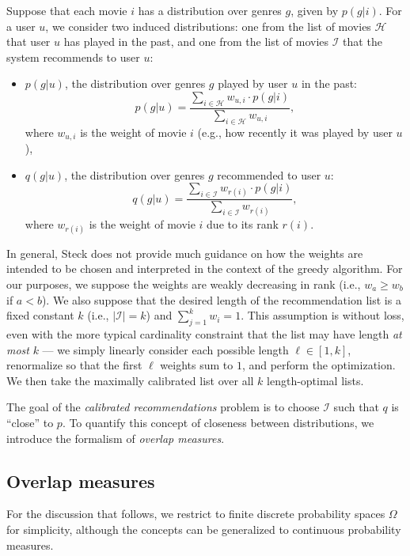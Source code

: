 Suppose that each movie $i$ has a distribution over genres $g$, given by $p(g|i)$. For a user $u$, we consider two induced distributions: one from the list of movies $\mathcal{H}$ that user $u$ has played in the past, and one from the list of movies $\mathcal{I}$ that the system recommends to user $u$:
\begin{itemize}
    \item $p(g|u)$, the distribution over genres $g$ played by user $u$ in the past: $$p(g|u) = \frac{\sum_{i\in \mathcal{H}} w_{u,i} \cdot p(g|i)}{\sum_{i\in \mathcal{H}} w_{u,i}},$$ where $w_{u,i}$ is the weight of movie $i$ (e.g., how recently it was played by user $u$),
    
    \item $q(g|u)$, the distribution over genres $g$ recommended to user $u$: $$q(g|u) = \frac{\sum_{i\in \mathcal{I}} w_{r(i)} \cdot p(g|i)}{\sum_{i\in \mathcal{I}} w_{r(i)}},$$ where $w_{r(i)}$ is the weight of movie $i$ due to its rank $r(i)$.
\end{itemize}

In general, Steck does not provide much guidance on how the weights are intended to be chosen and interpreted in the context of the greedy algorithm. For our purposes, we suppose the weights are weakly decreasing in rank (i.e., $w_a \ge w_b$ if $a < b$). We also suppose that the desired length of the recommendation list is a fixed constant $k$ (i.e., $|\mathcal{I}| = k$) and $\sum_{j=1}^k w_i = 1$. This assumption is without loss, even with the more typical cardinality constraint that the list may have length \emph{at most} $k$ --- we simply linearly consider each possible length $\ell \in [1,k]$, renormalize so that the first $\ell$ weights sum to $1$, and perform the optimization. We then take the maximally calibrated list over all $k$ length-optimal lists. 

The goal of the \emph{calibrated recommendations} problem is to choose $\mathcal{I}$ such that $q$ is ``close'' to $p$. To quantify this concept of closeness between distributions, we introduce the formalism of \emph{overlap measures}.

\subsection{Overlap measures}
For the discussion that follows, we restrict to finite discrete probability spaces $\Omega$ for simplicity, although the concepts can be generalized to continuous probability measures.

